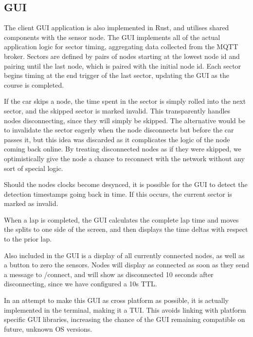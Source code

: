 \documentclass[journal]{IEEEtran}
\begin{document}
\subsection{GUI}

The client GUI application is also implemented in Rust, and utilises shared components with the sensor node. The GUI implements all of the actual application logic for sector timing, aggregating data collected from the MQTT broker. Sectors are defined by pairs of nodes starting at the lowest node id and pairing until the last node, which is paired with the initial node id. Each sector begins timing at the end trigger of the last sector, updating the GUI as the course is completed. 

If the car skips a node, the time spent in the sector is simply rolled into the next sector, and the skipped sector is marked invalid. This transparently handles nodes disconnecting, since they will simply be skipped. The alternative would be to invalidate the sector eagerly when the node disconnects but before the car passes it, but this idea was discarded as it complicates the logic of the node coming back online. By treating disconnected nodes as if they were skipped, we optimistically give the node a chance to reconnect with the network without any sort of special logic.

Should the nodes clocks become desynced, it is possible for the GUI to detect the detection timestamps going back in time. If this occurs, the current sector is marked as invalid. 

When a lap is completed, the GUI calculates the complete lap time and moves the splits to one side of the screen, and then displays the time deltas with respect to the prior lap.

Also included in the GUI is a display of all currently connected nodes, as well as a button to zero the sensors. Nodes will display as connected as soon as they send a message to /connect, and will show as disconnected 10 seconds after disconnecting, since we have configured a 10s TTL.

In an attempt to make this GUI as cross platform as possible, it is actually implemented in the terminal, making it a TUI. This avoids linking with platform specific GUI libraries, increasing the chance of the GUI remaining compatible on future, unknown OS versions.
\end{document}
